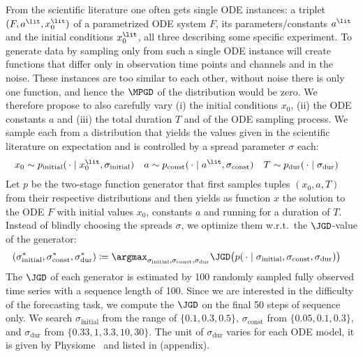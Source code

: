 From the scientific literature one often gets single ODE instances:
a triplet $(F, a^\lit, x_0^\lit)$ of a parametrized ODE system $F$,
its parameters/constants $a^\lit$ and the initial conditions $x_0^\lit$,
all three describing some specific experiment.
To generate data by sampling only from such a single ODE instance will create functions
that differ only in observation time points and channels and in the noise. These
instances are too similar to each other, without noise there is only one function,
and hence the $\MPGD$ of the distribution would be zero.
We therefore propose to also carefully vary
  (i) the initial conditions $x_0$,
  (ii) the ODE constants $a$ and
  (iii) the total duration $T$ and
of the ODE sampling process.
We sample each from a distribution %
that yields the values given in the scientific literature on expectation
and is controlled by a spread parameter $\sigma$ each:
%
\begin{align}\label{eq:ode-sampling}
	x_0	&\sim p_{\text{initial}}(\,\cdot\mid x_0^\lit, \sigma_{\text{initial}})
&	a	&\sim p_{\text{const}}(\,\cdot\mid a^\lit, \sigma_{\text{const}})
&	T	&\sim p_{\text{dur}}(\,\cdot\mid \sigma_{\text{dur}})
\end{align}
%
Let $p$ be the two-stage function generator that first samples tuples ${(x_0, a, T)}$
from their respective distributions and then yields as function $x$ the solution to the ODE
$F$ with initial values $x_0$, constants $a$ and running for a duration of $T$.
Instead of blindly choosing the spreads $\sigma$, we optimize them w.r.t.\ the $\JGD$-value of the generator:
%
\begin{align}\label{eq:optimal-sigma}
	(\sigma^*_{\text{initial}}, \sigma^*_{\text{const}}, \sigma^*_{\text{dur}})
	&\coloneqq \argmax_{\sigma_{\text{initial}}, \sigma_{\text{const}}, \sigma_{\text{dur}}}
	\JGD\bigl(
		p(\,\cdot \mid \sigma_{\text{initial}}, \sigma_{\text{const}}, \sigma_{\text{dur}})
	\bigr)
\end{align}
%
The $\JGD$ of each generator is estimated by 100 randomly sampled fully observed time series
with a sequence length of 100. Since we are interested in the difficulty of
the forecasting task, we compute the $\JGD$ on the final 50 steps of sequence only.
We search $\sigma_{\text{initial}}$ from the range of $\{0.1,0.3,0.5\}$,
$\sigma_{\text{const}}$ from $\{0.05,0.1,0.3\}$,
and $\sigma_{\text{dur}}$ from $\{0.33, 1, 3.3, 10, 30\}$.
The unit of $\sigma_\text{dur}$ varies for each ODE model,
it is given by Physiome~\citep{Yu2011.Physiome} and listed in  (appendix).

